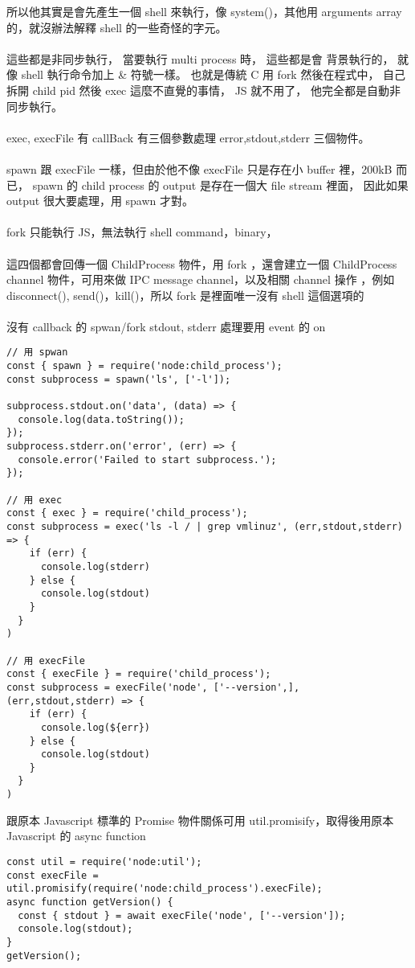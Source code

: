   所以他其實是會先產生一個 shell 來執行，像 system()，其他用 arguments
  array 的，就沒辦法解釋 shell 的一些奇怪的字元。
  \\\\
  這些都是非同步執行， 當要執行 multi process 時， 這些都是會
  背景執行的， 就像 shell 執行命令加上 \& 符號一樣。 也就是傳統 C 用 fork
  然後在程式中， 自己拆開 child pid 然後 exec 這麼不直覺的事情， JS 就不用了，
  他完全都是自動非同步執行。
  \\\\
  exec, execFile 有 callBack 有三個參數處理 error,stdout,stderr 三個物件。
  \\\\
  spawn 跟 execFile 一樣，但由於他不像 execFile 只是存在小 buffer 裡，200kB
  而已， spawn 的 child process 的 output 是存在一個大 file stream 裡面，
  因此如果 output 很大要處理，用 spawn 才對。
  \\\\
  fork 只能執行 JS，無法執行 shell command，binary，
  \\\\
  這四個都會回傳一個 ChildProcess 物件，用 fork ，還會建立一個 ChildProcess
  channel 物件，可用來做 IPC message channel，以及相關 channel 操作 ，例如
  disconnect(), send()，kill()，所以 fork 是裡面唯一沒有 shell 這個選項的
  \\\\
  沒有 callback 的 spwan/fork stdout, stderr 處理要用 event 的 on
  \begin{verbatim}
// 用 spwan
const { spawn } = require('node:child_process');
const subprocess = spawn('ls', ['-l']);

subprocess.stdout.on('data', (data) => {
  console.log(data.toString());
});
subprocess.stderr.on('error', (err) => {
  console.error('Failed to start subprocess.');
});

// 用 exec
const { exec } = require('child_process');
const subprocess = exec('ls -l / | grep vmlinuz', (err,stdout,stderr) => {
    if (err) {
      console.log(stderr)
    } else {
      console.log(stdout)
    }
  }
)

// 用 execFile
const { execFile } = require('child_process');
const subprocess = execFile('node', ['--version',], (err,stdout,stderr) => {
    if (err) {
      console.log(${err})
    } else {
      console.log(stdout)
    } 
  }
)
  \end{verbatim}
  跟原本 Javascript 標準的 Promise  
  物件關係可用 util.promisify，取得後用原本 Javascript 的 async function
  \begin{verbatim}
const util = require('node:util');
const execFile = util.promisify(require('node:child_process').execFile);
async function getVersion() {
  const { stdout } = await execFile('node', ['--version']);
  console.log(stdout);
}
getVersion();
  \end{verbatim}
